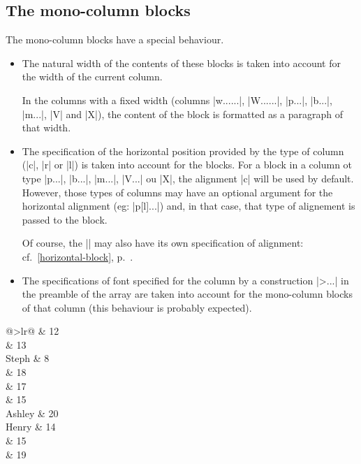 \documentclass[dvipsnames]{article}
\begin{document}
\subsection{The mono-column blocks}

The mono-column blocks have a special behaviour.

\begin{itemize}
\item The natural width of the contents of these blocks is taken into account
for the width of the current column.

In the columns with a fixed width (columns |w{...}{...}|, |W{...}{...}|,
|p{...}|, |b{...}|, |m{...}|, |V| and |X|), the content of the block is
formatted as a paragraph of that width.

\item The specification of the horizontal position provided by the type of
column (|c|, |r| or |l|) is taken into account for the blocks. For a block in a
column ot type |p{...}|, |b{...}|, |m{...}|, |V{...}| ou |X|, the alignment |c|
will be used by default. However, those types of columns may have an optional
argument for the horizontal alignment (eg: |p[l]{...}|) and, in that case, that
type of alignement is passed to the block.

Of course, the |\Block| may also have its own specification of alignment:
cf.~\ref{horizontal-block}, p.~\pageref{horizontal-block}.

\item The specifications of font specified for the column by a construction
|>{...}| in the preamble of the array are taken into account for the
mono-column blocks of that column (this behaviour is probably expected).
\end{itemize}


\bigskip

\begin{Code}[width=12cm,show-output]
\begin{NiceTabular}{@{}>{\bfseries}lr@{}} \hline
      & 12 \\
                       & 13 \\ \hline
  Steph                &  8 \\ \hline
     & 18 \\
                       & 17 \\
                       & 15 \\ \hline
  Ashley               & 20 \\ \hline
  Henry                & 14 \\ \hline
   & 15 \\
                       & 19 \\ \hline
\end{NiceTabular}
\end{Code}
\end{document}
